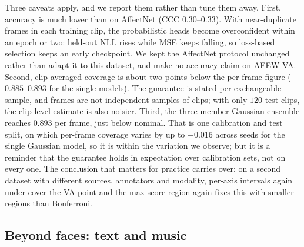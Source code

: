 Three caveats apply, and we report them rather than tune them away. First,
accuracy is much lower than on AffectNet (CCC $0.30$--$0.33$). With near-duplicate
frames in each training clip, the probabilistic heads become overconfident
within an epoch or two: held-out NLL rises while MSE keeps falling, so loss-based
selection keeps an early checkpoint. We kept the AffectNet protocol unchanged
rather than adapt it to this dataset, and make no accuracy claim on AFEW-VA.
Second, clip-averaged coverage is about two points below the per-frame
figure ($0.885$--$0.893$ for the single models). The guarantee is stated per
exchangeable sample, and frames are not independent samples of clips; with only
$120$ test clips, the clip-level estimate is also noisier. Third, the
three-member Gaussian ensemble reaches $0.893$ per frame, just below nominal.
That is one calibration and test split, on which per-frame coverage varies by
up to $\pm0.016$ across seeds for the single Gaussian model, so it is within the
variation we observe; but it is a reminder that the guarantee holds in
expectation over calibration sets, not on every one. The conclusion that matters
for practice carries over: on a second dataset with different sources,
annotators and modality, per-axis intervals again under-cover the VA point and
the max-score region again fixes this with smaller regions than Bonferroni.

\begin{table}[h]
  \centering\small
  \resizebox{\linewidth}{!}{}
  \caption{AFEW-VA, trained, calibrated and tested within the dataset, split by
  clip (nominal $90\%$; mean$_{\pm\text{std}}$ over three seeds; ensembles
  combine the three seeds). Joint: fraction of test frames whose true VA point
  lies in the region. Area: mean region area. Joint/clip: max-score coverage
  averaged per clip, so that each of the $120$ test clips counts once.}
  \label{tab:afew}
\end{table}

\subsection{Beyond faces: text and music}
\label{sec:emobank}
